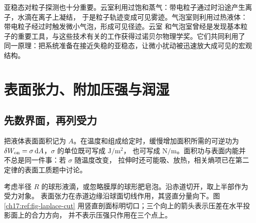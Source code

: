 {亚稳态对粒子探测也十分重要。云室利用过饱和蒸气：带电粒子通过时沿途产生离子，水滴在离子上凝结，
于是粒子轨迹变成可见雾迹。气泡室则利用过热液体：带电粒子经过时触发微小气泡，形成可见径迹。云室
和气泡室曾经是发现基本粒子的重要工具，与这些技术有关的工作获得过诺贝尔物理学奖。它们共同利用了
同一原理：把系统准备在接近失稳的亚稳态，让微小扰动被迅速放大成可见的宏观结构。

\section{表面张力、附加压强与润湿}

\subsection{先数界面，再列受力}

把液体表面面积记为 $A$。在温度和组成给定时，缓慢增加面积所需的可逆功为
$\delta W_{\rm on}=\sigma\mathop{}\!\mathrm d A$，$\sigma$ 的单位既可写成 $\mathrm{J/m^2}$，
也可写成 $\mathrm{N/m}$。面积功与表面内能并不总是同一件事：若 $\sigma$ 随温度改变，
拉伸时还可能吸、放热，相关熵项已在第二定律的表面工质题中讨论。

考虑半径 $R$ 的球形液滴，或忽略膜厚的球形肥皂泡。沿赤道切开，取上半部作为受力对象。
表面张力在赤道边缘沿球面切线作用，其竖直分量向下。图\ref{ch17:ref:fig-laplace-cut}
用竖直剖面标明切口；三个向上的箭头表示压差在水平投影面上的合力方向，
并不表示压强只作用在三个点上。

\begin{center}\begin{minipage}{\linewidth}\centering
{}
\label{ch17:ref:fig-laplace-cut}
\end{minipage}\end{center}

}
